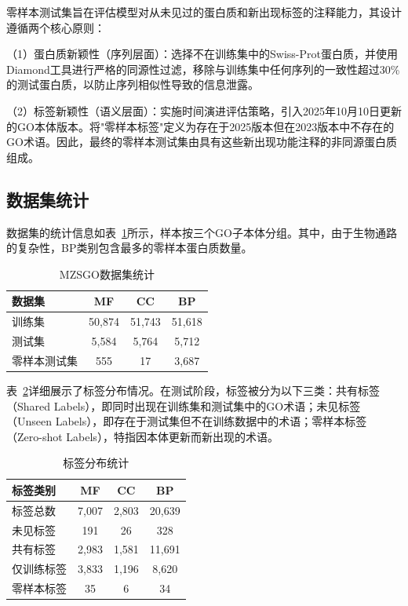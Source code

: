 零样本测试集旨在评估模型对从未见过的蛋白质和新出现标签的注释能力，其设计遵循两个核心原则：

（1）蛋白质新颖性（序列层面）：选择不在训练集中的Swiss-Prot蛋白质，并使用Diamond工具进行严格的同源性过滤，移除与训练集中任何序列的一致性超过30\%的测试蛋白质，以防止序列相似性导致的信息泄露。

（2）标签新颖性（语义层面）：实施时间演进评估策略，引入2025年10月10日更新的GO本体版本。将"零样本标签"定义为存在于2025版本但在2023版本中不存在的GO术语。因此，最终的零样本测试集由具有这些新出现功能注释的非同源蛋白质组成。

\subsection{数据集统计}

数据集的统计信息如表~\ref{tab:mzsgo_dataset_stats}所示，样本按三个GO子本体分组。其中，由于生物通路的复杂性，BP类别包含最多的零样本蛋白质数量。

\begin{table}[h]
\centering
\caption{MZSGO数据集统计}
\label{tab:mzsgo_dataset_stats}
\small
\begin{tabular}{lccc}
\toprule
数据集 & MF & CC & BP \\
\midrule
训练集 & 50,874 & 51,743 & 51,618 \\
测试集 & 5,584 & 5,764 & 5,712 \\
零样本测试集 & 555 & 17 & 3,687 \\
\bottomrule
\end{tabular}
\end{table}

表~\ref{tab:mzsgo_label_stats}详细展示了标签分布情况。在测试阶段，标签被分为以下三类：共有标签（Shared Labels），即同时出现在训练集和测试集中的GO术语；未见标签（Unseen Labels），即存在于测试集但不在训练数据中的术语；零样本标签（Zero-shot Labels），特指因本体更新而新出现的术语。

\begin{table}[h]
\centering
\caption{标签分布统计}
\label{tab:mzsgo_label_stats}
\small
\begin{tabular}{lccc}
\toprule
标签类别 & MF & CC & BP \\
\midrule
标签总数 & 7,007 & 2,803 & 20,639 \\
未见标签 & 191 & 26 & 328 \\
共有标签 & 2,983 & 1,581 & 11,691 \\
仅训练标签 & 3,833 & 1,196 & 8,620 \\
零样本标签 & 35 & 6 & 34 \\
\bottomrule
\end{tabular}
\end{table}

